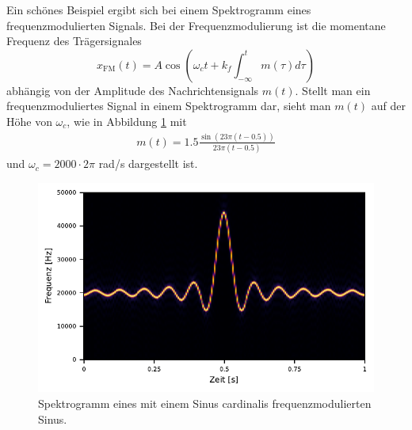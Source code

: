 Ein schönes Beispiel ergibt sich bei einem Spektrogramm eines frequenzmodulierten 
Signals.
Bei der Frequenzmodulierung \cite{sonogramm:NAT} ist die momentane Frequenz des Trägersignales 
\begin{equation}
    x_{\text{FM}}(t) = A \cos\left( \omega_c t + k_f \int_{-\infty}^{t} m(\tau) d\tau\right)
\end{equation}
abhängig von der Amplitude des Nachrichtensignals $m(t)$.
Stellt man ein frequenzmoduliertes Signal in einem Spektrogramm dar,
sieht man $m(t)$ auf der Höhe von $\omega_c$, wie in Abbildung \ref{sonogramm:fmsono} mit 
\begin{align}
    m(t) = 1.5 \frac{\sin(23 \pi (t-0.5))}{23 \pi (t-0.5)}
\end{align}
und $\omega_c =2000\cdot 2\pi$ rad/s dargestellt ist.
\begin{figure}
    \centering
    \includegraphics{papers/sonogramm/images/fm_sono_windows.pdf}
    \caption{Spektrogramm eines mit einem Sinus cardinalis frequenzmodulierten Sinus.
    \label{sonogramm:fmsono}
    }
\end{figure}
